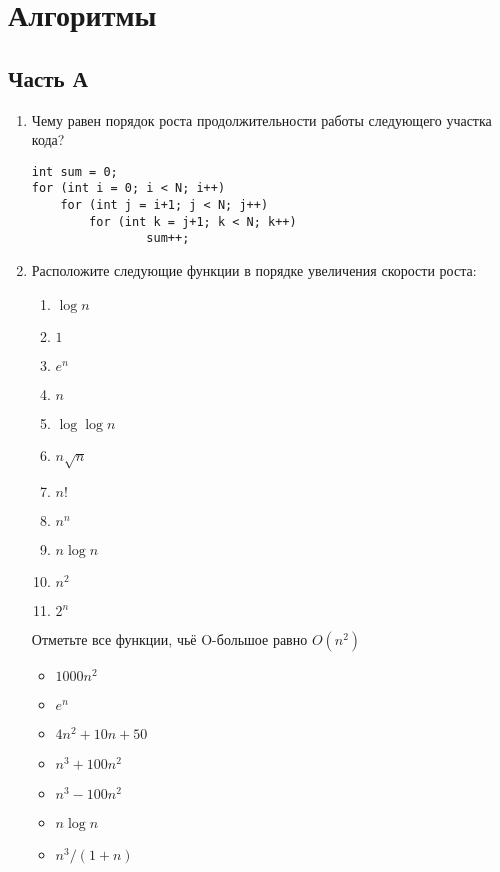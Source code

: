 \documentclass[12pt]{article}
\begin{document}

\section*{Алгоритмы}
\subsection*{Часть А}

\begin{enumerate}
\item \textbf{} Чему равен порядок роста продолжительности работы следующего участка кода?
\begin{verbatim}
int sum = 0;
for (int i = 0; i < N; i++)
    for (int j = i+1; j < N; j++)
        for (int k = j+1; k < N; k++)
                sum++;
\end{verbatim}
\item Расположите следующие функции в порядке увеличения скорости роста:
\begin{multicols}{3}
\begin{enumerate}
\item $\log{n}$
\item $1$
\item $e^n$
\item $n$
\item $\log{\log{n}}$
\item $n\sqrt{n}$
\item $n!$
\item $n^n$
\item $n\log{n}$
\item $n^2$
\item $2^n$
\end{enumerate}
\end{multicols}

Отметьте все функции, чьё O-большое равно $O(n^2)$
\begin{multicols}{2}
\begin{itemize}
\item $1000 n^2$
\item $e^n$
\item $4 n^2 + 10 n + 50$
\item $n^3 + 100 n^2$
\item $n^3 - 100 n^2$
\item $n\log{n}$
\item $n^3 / (1 + n)$
\end{itemize}
\end{multicols}


\end{enumerate}
\end{document}
